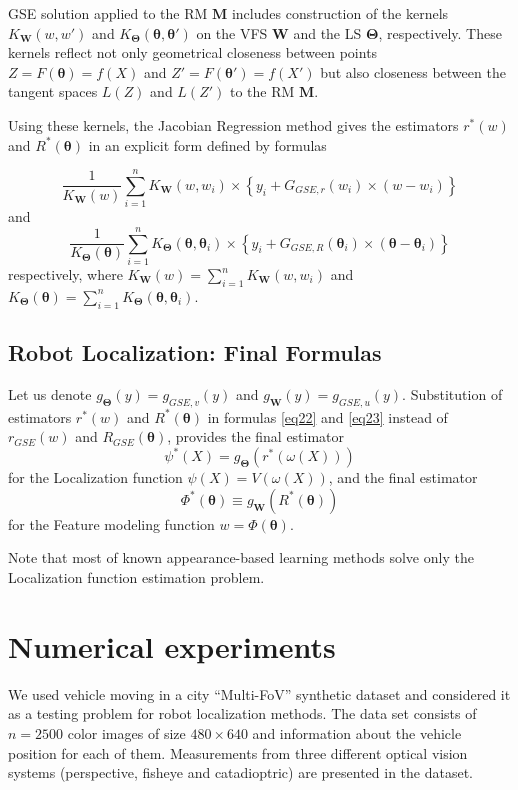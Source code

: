 \documentclass[conference]{IEEEtran} %
\def\mbW{\mathbf{W}}
\def\mbTheta{{\bm\Theta}}
\def\mbtheta{{\bm\theta}}
\def\mbM{\mathbf{M}}
\begin{document}
GSE solution applied to the RM $\mbM$ includes construction of the kernels $K_{\mathbf{W}}(w, w')$ and $K_{\mbTheta}(\mbtheta, \mbtheta')$ on the VFS $\mbW$ and the LS $\mbTheta$, respectively. These kernels reflect not only geometrical closeness between points $Z = F(\mbtheta) = f(X)$ and $Z' = F(\mbtheta') = f(X')$ but also closeness between the tangent spaces $L(Z)$ and $L(Z')$ to the RM $\mbM$. 

Using these kernels, the Jacobian Regression method gives the estimators $r^*(w)$ and $R^*(\mbtheta)$ in an explicit form defined by formulas

\[
	\frac{1}{K_{\mathbf{W}}(w)} \sum_{i=1}^n K_{\mathbf{W}}(w,w_i)\times\left\{y_i+G_{GSE,r}(w_i)\times(w-w_i)\right\}
\]
and
\[
	\frac{1}{K_{\mbTheta}(\mbtheta)} \sum_{i=1}^n K_{\mbTheta}(\mbtheta, \mbtheta_i)\times\left\{y_i+G_{GSE,R}(\mbtheta_i)\times(\mbtheta-\mbtheta_i)\right\}
\]
respectively, where
$K_{\mathbf{W}}(w) = \sum_{i=1}^n K_{\mathbf{W}}(w,w_i)$ and 
$K_\mbTheta(\mbtheta) = \sum_{i=1}^n K_{\mbTheta}(\mbtheta,\mbtheta_i)$.

\subsection{Robot Localization: Final Formulas}

Let us denote $g_{\mbTheta}(y) = g_{GSE,v}(y)$ and $g_{\mathbf{W}}(y) = g_{GSE,u}(y)$. Substitution of estimators $r^*(w)$ and $R^*(\mbtheta)$ in formulas \eqref{eq22} and \eqref{eq23} instead of $r_{GSE}(w)$ and $R_{GSE}(\mbtheta)$, provides the final estimator 
\[
	\psi^*(X) = g_{\mbTheta}(r^*(\omega(X)))
\]
for the Localization function $\psi(X) = V(\omega(X))$, and the final estimator
\[
	\Phi^*(\mbtheta) \equiv g_{\mathbf{W}}(R^*(\mbtheta))
\]
for the Feature modeling function $w = \Phi(\mbtheta)$.

Note that most of known appearance-based learning methods solve only the Localization function estimation problem.

\section{Numerical experiments}
\label{sec5}

We used vehicle moving in a city ``Multi-FoV'' synthetic dataset \cite{Zhang2016} and considered it as a testing problem for robot localization methods. The data set consists of $n = 2500$ color images of size $480 \times 640$ and information about the vehicle position for each of them. Measurements from three different optical vision systems (perspective, fisheye and catadioptric) are presented in the dataset.
\end{document}
